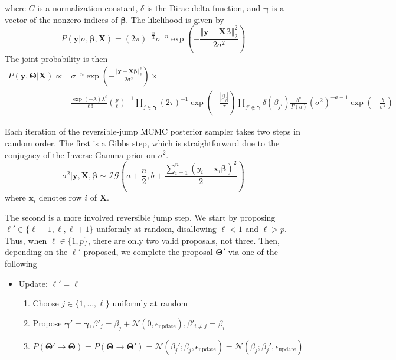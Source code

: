 \documentclass[a4paper,11pt]{article}
\begin{document}
where $C$ is a normalization constant, $\delta$ is the Dirac delta function, and $\mathbf{\gamma}$ is a vector of the nonzero indices of $\mathbf{\beta}$.
The likelihood is given by
\begin{equation}
  P(\mathbf{y} | \sigma, \mathbf{\beta}, \mathbf{X} ) = (2\pi)^{-\frac{n}{2}} \sigma^{-n} \exp{\left(-\frac{\Vert\mathbf{y}-\mathbf{X}\mathbf{\beta}\Vert^{2}_{2}}{2\sigma^{2}}\right)}
\end{equation}
The joint probability is then
\begin{equation}
    \begin{aligned}
         P(\mathbf{y}, \mathbf{\Theta} | \mathbf{X} ) \propto &\sigma^{-n} \exp{\left(-\frac{\Vert\mathbf{y}-\mathbf{X}\mathbf{\beta}\Vert^{2}_{2}}{2\sigma^{2}}\right)} \times \\ 
         & \frac{\exp{(-\lambda)} \lambda^{\ell}}{\ell!} {p\choose \ell}^{-1} \prod_{j\in \mathbf{\gamma}} (2\tau)^{-1}\exp\left(-\frac{|\beta_{j}|}{\tau}\right) \prod_{j' \notin \mathbf{\gamma}} \delta(\beta_{j'}) \frac{b^{a}}{\Gamma(a)} (\sigma^{2})^{-a-1} \exp{\left(-\frac{b}{\sigma^{2}}\right)}
    \end{aligned}
    \label{eq:ex2_joint}
\end{equation}

Each iteration of the reversible-jump MCMC posterior sampler takes two steps in random order. The first is a Gibbs step, which is straightforward due to the conjugacy of the Inverse Gamma prior on $\sigma^{2}$.
\begin{equation}
    \sigma^{2} | \mathbf{y}, \mathbf{X}, \mathbf{\beta} \sim \mathcal{IG}\left(a + \frac{n}{2}, b + \frac{\sum_{i=1}^{n}(y_{i}-\mathbf{x}_{i}\mathbf{\beta})^{2} }{2}\right)
\end{equation}
where $\mathbf{x}_{i}$ denotes row $i$ of $\mathbf{X}$.

The second is a more involved reversible jump step. We start by proposing $\ell' \in \{\ell-1, \ell, \ell+1\}$ uniformly at random, disallowing $\ell<1$ and $\ell>p$. Thus, when $\ell \in \{1,p\}$, there are only two valid proposals, not three. Then, depending on the $\ell'$ proposed, we complete the proposal $\mathbf{\Theta}'$ via one of the following
\begin{itemize}
    \item Update: $\ell' = \ell$
    \begin{enumerate}
        \item Choose $j \in \{1, \ldots, \ell\}$ uniformly at random
        \item Propose $\mathbf{\gamma}' = \mathbf{\gamma}, \beta'_{j} = \beta_{j} + \mathcal{N}(0, \epsilon_{\text{update}}), \beta'_{i \neq j} = \beta_{i}$
        \item $P(\mathbf{\Theta}' \rightarrow \mathbf{\Theta}) = P(\mathbf{\Theta} \rightarrow \mathbf{\Theta}')=\mathcal{N}(\beta_{j}'; \beta_{j},\epsilon_{\text{update}})=\mathcal{N}(\beta_{j}; \beta_{j}',\epsilon_{\text{update}})$
    \end{enumerate}
\end{itemize}
\end{document}
